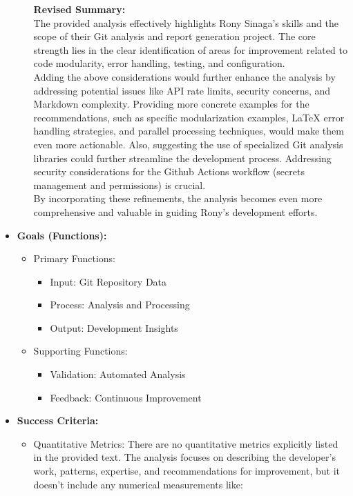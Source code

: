 \documentclass{article}
\begin{document}
\begin{itemize}
\begin{itemize}
\textbf{Revised Summary:}\\
The provided analysis effectively highlights Rony Sinaga's skills and the scope of their Git analysis and report generation project. The core strength lies in the clear identification of areas for improvement related to code modularity, error handling, testing, and configuration. \\
Adding the above considerations would further enhance the analysis by addressing potential issues like API rate limits, security concerns, and Markdown complexity. Providing more concrete examples for the recommendations, such as specific modularization examples, LaTeX error handling strategies, and parallel processing techniques, would make them even more actionable. Also, suggesting the use of specialized Git analysis libraries could further streamline the development process. Addressing security considerations for the Github Actions workflow (secrets management and permissions) is crucial.\\
By incorporating these refinements, the analysis becomes even more comprehensive and valuable in guiding Rony's development efforts.
    \end{itemize}
    \item \textbf{Goals (Functions):}
    \begin{itemize}
        \item Primary Functions:
        \begin{itemize}
            \item Input: Git Repository Data
            \item Process: Analysis and Processing
            \item Output: Development Insights
        \end{itemize}
        \item Supporting Functions:
        \begin{itemize}
            \item Validation: Automated Analysis
            \item Feedback: Continuous Improvement
        \end{itemize}
    \end{itemize}
    \item \textbf{Success Criteria:}
    \begin{itemize}
        \item Quantitative Metrics: There are no quantitative metrics explicitly listed in the provided text. The analysis focuses on describing the developer's work, patterns, expertise, and recommendations for improvement, but it doesn't include any numerical measurements like:

\end{itemize}
\end{itemize}
\end{document}
